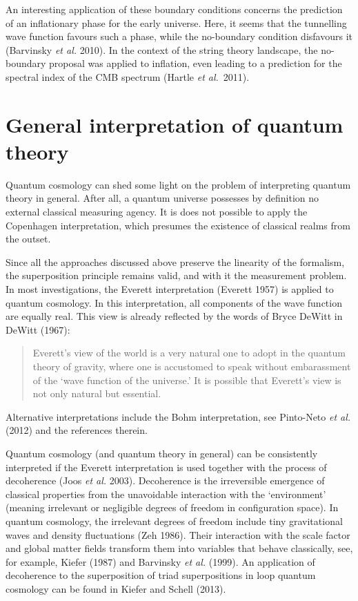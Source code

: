 \documentclass[12pt]{article}
\begin{document}
An interesting application of these boundary conditions concerns the
prediction of an inflationary phase for the early universe. Here, it
seems that the tunnelling wave function favours such a phase, while
the no-boundary condition disfavours it (Barvinsky {\em et al.}
2010). In the context of the string theory landscape, the no-boundary
proposal was applied to inflation, even leading to a prediction
for the spectral index of the CMB spectrum (Hartle {\em et al.}~2011).   


\section{General interpretation of quantum theory}

Quantum cosmology can shed some light on the problem of interpreting
quantum theory in general. After all, a quantum universe possesses by
definition no external classical measuring agency. It is does not
possible to apply the Copenhagen interpretation, which presumes the
existence of classical realms from the outset. 

Since all the approaches discussed above preserve the linearity of the
formalism, the superposition principle remains valid, and with it the
measurement problem. In most investigations, the Everett
interpretation (Everett 1957) is applied to quantum cosmology. In this
interpretation, all components of the wave function are equally real.
This view is already reflected by the words of Bryce DeWitt in DeWitt
(1967):
\begin{quote}
Everett's view of the world is a very natural one to adopt in the
quantum theory of gravity, where one is accustomed to speak without
embarassment of the `wave function of the universe.' It is possible
that Everett's view is not only natural but essential.
\end{quote}
Alternative interpretations include the Bohm interpretation, see
Pinto-Neto {\em et al.} (2012) and the references therein.

Quantum cosmology (and quantum theory in general) can be consistently
interpreted if the Everett interpretation is used together with the
process of decoherence (Joos {\em et al.} 2003). Decoherence is the
irreversible emergence of classical properties from the unavoidable
interaction with the `environment' (meaning irrelevant or negligible
degrees of freedom in configuration space). In quantum cosmology, the
irrelevant degrees of freedom include tiny gravitational waves and
density fluctuations (Zeh 1986). Their interaction with the scale
factor and global matter fields transform them into variables that
behave classically, see, for example, Kiefer (1987) and Barvinsky {\em
et al.} (1999). An application of decoherence to the superposition of
triad superpositions in loop quantum cosmology can be found in Kiefer
and Schell (2013).
\end{document}
